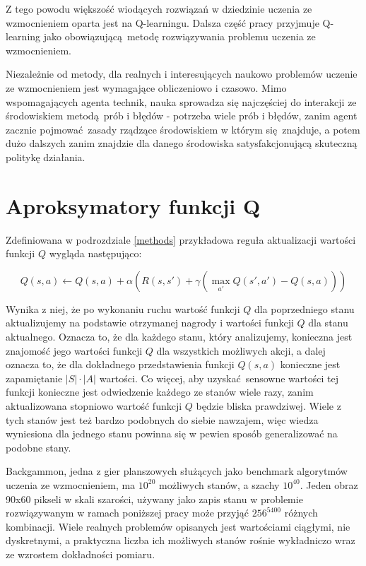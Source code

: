 \documentclass[polish,master,a4paper,oneside]{ppfcmthesis}
\begin{document}
Z tego powodu większość wiodących rozwiązań w dziedzinie uczenia ze wzmocnieniem oparta jest na Q-learningu. Dalsza część pracy przyjmuje Q-learning jako obowiązującą metodę rozwiązywania problemu uczenia ze wzmocnieniem.

Niezależnie od metody, dla realnych i interesujących naukowo problemów uczenie ze wzmocnieniem jest wymagające obliczeniowo i czasowo. Mimo wspomagających agenta technik, nauka sprowadza się najczęściej do interakcji ze środowiskiem metodą prób i błędów - potrzeba wiele prób i błędów, zanim agent zacznie pojmować zasady rządzące środowiskiem w którym się znajduje, a potem dużo dalszych zanim znajdzie dla danego środowiska satysfakcjonującą skuteczną politykę działania.

 \section{Aproksymatory funkcji Q}

Zdefiniowana w podrozdziale \ref{methods} przykładowa reguła aktualizacji wartości funkcji $Q$ wygląda następująco:

$$Q(s,a) \leftarrow Q(s,a) + \alpha (R(s,s') + \gamma (\max_{a'}Q(s',a') - Q (s,a)))$$

Wynika z niej, że po wykonaniu ruchu wartość funkcji $Q$ dla poprzedniego stanu aktualizujemy na podstawie otrzymanej nagrody i wartości funkcji $Q$ dla stanu aktualnego. Oznacza to, że dla każdego stanu, który analizujemy, konieczna jest znajomość jego wartości funkcji $Q$ dla wszystkich możliwych akcji, a dalej oznacza to, że dla dokładnego przedstawienia funkcji $Q(s,a)$  konieczne jest zapamiętanie $\left\vert{S}\right\vert \cdot \left\vert{A}\right\vert$ wartości. Co więcej, aby uzyskać sensowne wartości tej funkcji konieczne jest odwiedzenie każdego ze stanów wiele razy, zanim aktualizowana stopniowo wartość funkcji $Q$ będzie bliska prawdziwej. Wiele z tych stanów jest też bardzo podobnych do siebie nawzajem, więc wiedza wyniesiona dla jednego stanu powinna się w pewien sposób generalizować na podobne stany.

Backgammon, jedna z gier planszowych służących jako benchmark algorytmów uczenia ze wzmocnieniem, ma $10^{20}$ możliwych stanów, a szachy $10^{40}$. Jeden obraz 90x60 pikseli w skali szarości, używany jako zapis stanu w problemie rozwiązywanym w ramach poniższej pracy może przyjąć $256^{5400}$ różnych kombinacji. Wiele realnych problemów opisanych jest wartościami ciągłymi, nie dyskretnymi, a praktyczna liczba ich możliwych stanów rośnie wykładniczo wraz ze wzrostem dokładności pomiaru.
\end{document}
